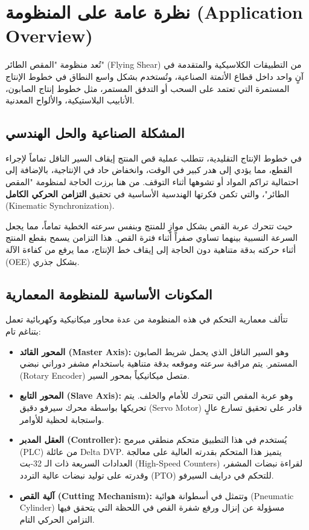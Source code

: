 \section{نظرة عامة على المنظومة \textenglish{(Application Overview)}}
تُعد منظومة "المقص الطائر" \textenglish{(Flying Shear)} من التطبيقات الكلاسيكية والمتقدمة في آنٍ واحد داخل قطاع الأتمتة الصناعية، وتُستخدم بشكل واسع النطاق في خطوط الإنتاج المستمرة التي تعتمد على السحب أو التدفق المستمر، مثل خطوط إنتاج الصابون، الأنابيب البلاستيكية، والألواح المعدنية.

\subsection{المشكلة الصناعية والحل الهندسي}
في خطوط الإنتاج التقليدية، تتطلب عملية قص المنتج إيقاف السير الناقل تماماً لإجراء القطع، مما يؤدي إلى هدر كبير في الوقت، وانخفاض حاد في الإنتاجية، بالإضافة إلى احتمالية تراكم المواد أو تشوهها أثناء التوقف. من هنا برزت الحاجة لمنظومة "المقص الطائر"، والتي تكمن فكرتها الهندسية الأساسية في تحقيق \textbf{التزامن الحركي الكامل} \textenglish{(Kinematic Synchronization)}. 

حيث تتحرك عربة القص بشكل موازٍ للمنتج وبنفس سرعته الخطية تماماً، مما يجعل السرعة النسبية بينهما تساوي صفراً أثناء فترة القص. هذا التزامن يسمح بقطع المنتج أثناء حركته بدقة متناهية دون الحاجة إلى إيقاف خط الإنتاج، مما يرفع من كفاءة الآلة \textenglish{(OEE)} بشكل جذري.

\subsection{المكونات الأساسية للمنظومة المعمارية}
تتألف معمارية التحكم في هذه المنظومة من عدة محاور ميكانيكية وكهربائية تعمل بتناغم تام:
\begin{itemize}
    \item \textbf{المحور القائد \textenglish{(Master Axis)}:} وهو السير الناقل الذي يحمل شريط الصابون المستمر. يتم مراقبة سرعته وموقعه بدقة متناهية باستخدام مشفر دوراني نبضي \textenglish{(Rotary Encoder)} متصل ميكانيكياً بمحور السير.
    \item \textbf{المحور التابع \textenglish{(Slave Axis)}:} وهو عربة المقص التي تتحرك للأمام والخلف. يتم تحريكها بواسطة محرك سيرفو دقيق \textenglish{(Servo Motor)} قادر على تحقيق تسارع عالٍ واستجابة لحظية للأوامر.
    \item \textbf{العقل المدبر \textenglish{(Controller)}:} يُستخدم في هذا التطبيق متحكم منطقي مبرمج \textenglish{(PLC)} من عائلة \textenglish{Delta DVP}. يتميز هذا المتحكم بقدرته العالية على معالجة العدادات السريعة ذات الـ 32-بت \textenglish{(High-Speed Counters)} لقراءة نبضات المشفر، وقدرته على توليد نبضات عالية التردد \textenglish{(PTO)} للتحكم في درايف السيرفو.
    \item \textbf{آلية القص \textenglish{(Cutting Mechanism)}:} وتتمثل في أسطوانة هوائية \textenglish{(Pneumatic Cylinder)} مسؤولة عن إنزال ورفع شفرة القص في اللحظة التي يتحقق فيها التزامن الحركي التام.
\end{itemize}

